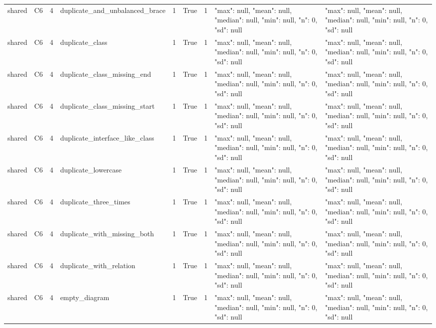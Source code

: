 \begin{tabular}{lllllllll}
shared & C6 & 4 & duplicate\_and\_unbalanced\_brace & 1 & True & 1 & {"max": null, "mean": null, "median": null, "min": null, "n": 0, "sd": null} & {"max": null, "mean": null, "median": null, "min": null, "n": 0, "sd": null} \\
shared & C6 & 4 & duplicate\_class & 1 & True & 1 & {"max": null, "mean": null, "median": null, "min": null, "n": 0, "sd": null} & {"max": null, "mean": null, "median": null, "min": null, "n": 0, "sd": null} \\
shared & C6 & 4 & duplicate\_class\_missing\_end & 1 & True & 1 & {"max": null, "mean": null, "median": null, "min": null, "n": 0, "sd": null} & {"max": null, "mean": null, "median": null, "min": null, "n": 0, "sd": null} \\
shared & C6 & 4 & duplicate\_class\_missing\_start & 1 & True & 1 & {"max": null, "mean": null, "median": null, "min": null, "n": 0, "sd": null} & {"max": null, "mean": null, "median": null, "min": null, "n": 0, "sd": null} \\
shared & C6 & 4 & duplicate\_interface\_like\_class & 1 & True & 1 & {"max": null, "mean": null, "median": null, "min": null, "n": 0, "sd": null} & {"max": null, "mean": null, "median": null, "min": null, "n": 0, "sd": null} \\
shared & C6 & 4 & duplicate\_lowercase & 1 & True & 1 & {"max": null, "mean": null, "median": null, "min": null, "n": 0, "sd": null} & {"max": null, "mean": null, "median": null, "min": null, "n": 0, "sd": null} \\
shared & C6 & 4 & duplicate\_three\_times & 1 & True & 1 & {"max": null, "mean": null, "median": null, "min": null, "n": 0, "sd": null} & {"max": null, "mean": null, "median": null, "min": null, "n": 0, "sd": null} \\
shared & C6 & 4 & duplicate\_with\_missing\_both & 1 & True & 1 & {"max": null, "mean": null, "median": null, "min": null, "n": 0, "sd": null} & {"max": null, "mean": null, "median": null, "min": null, "n": 0, "sd": null} \\
shared & C6 & 4 & duplicate\_with\_relation & 1 & True & 1 & {"max": null, "mean": null, "median": null, "min": null, "n": 0, "sd": null} & {"max": null, "mean": null, "median": null, "min": null, "n": 0, "sd": null} \\
shared & C6 & 4 & empty\_diagram & 1 & True & 1 & {"max": null, "mean": null, "median": null, "min": null, "n": 0, "sd": null} & {"max": null, "mean": null, "median": null, "min": null, "n": 0, "sd": null} \\

\end{tabular}
